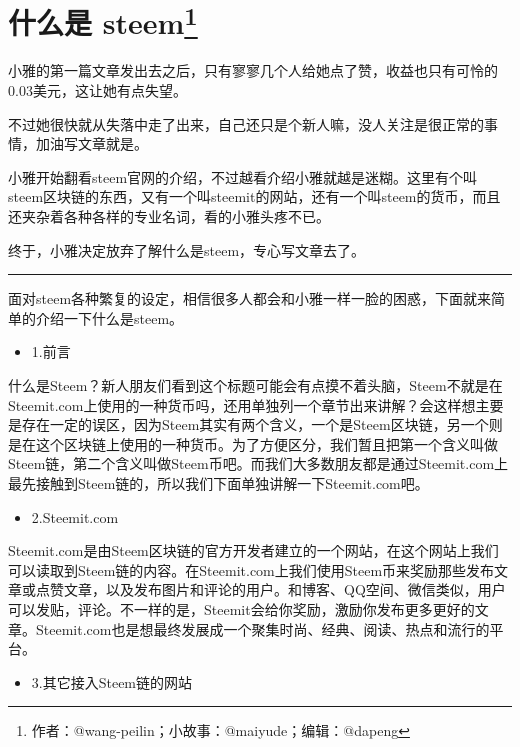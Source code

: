 \documentclass[]{ctexbook}
\providecommand{\tightlist}{%
  \setlength{\itemsep}{0pt}\setlength{\parskip}{0pt}}
\begin{document}
\hypertarget{what-is-steem}{%
\section[什么是 steem]{\texorpdfstring{什么是 steem\footnote{作者：@wang-peilin；小故事：@maiyude；编辑：@dapeng}}{什么是 steem}}\label{what-is-steem}}

小雅的第一篇文章发出去之后，只有寥寥几个人给她点了赞，收益也只有可怜的0.03美元，这让她有点失望。

不过她很快就从失落中走了出来，自己还只是个新人嘛，没人关注是很正常的事情，加油写文章就是。

小雅开始翻看steem官网的介绍，不过越看介绍小雅就越是迷糊。这里有个叫steem区块链的东西，又有一个叫steemit的网站，还有一个叫steem的货币，而且还夹杂着各种各样的专业名词，看的小雅头疼不已。

终于，小雅决定放弃了解什么是steem，专心写文章去了。

\begin{center}\rule{0.5\linewidth}{\linethickness}\end{center}

面对steem各种繁复的设定，相信很多人都会和小雅一样一脸的困惑，下面就来简单的介绍一下什么是steem。

\begin{itemize}
\tightlist
\item
  1.前言
\end{itemize}

什么是Steem？新人朋友们看到这个标题可能会有点摸不着头脑，Steem不就是在Steemit.com上使用的一种货币吗，还用单独列一个章节出来讲解？会这样想主要是存在一定的误区，因为Steem其实有两个含义，一个是Steem区块链，另一个则是在这个区块链上使用的一种货币。为了方便区分，我们暂且把第一个含义叫做Steem链，第二个含义叫做Steem币吧。而我们大多数朋友都是通过Steemit.com上最先接触到Steem链的，所以我们下面单独讲解一下Steemit.com吧。

\begin{itemize}
\tightlist
\item
  2.Steemit.com
\end{itemize}

Steemit.com是由Steem区块链的官方开发者建立的一个网站，在这个网站上我们可以读取到Steem链的内容。在Steemit.com上我们使用Steem币来奖励那些发布文章或点赞文章，以及发布图片和评论的用户。和博客、QQ空间、微信类似，用户可以发贴，评论。不一样的是，Steemit会给你奖励，激励你发布更多更好的文章。Steemit.com也是想最终发展成一个聚集时尚、经典、阅读、热点和流行的平台。

\begin{itemize}
\tightlist
\item
  3.其它接入Steem链的网站
\end{itemize}
\end{document}
